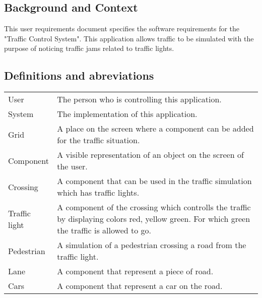 \documentclass[a4paper,11pt]{article}
\title{\Title}
\author{}
\date{\today}
\begin{document}
\begin{titlepage}
\maketitle
\end{titlepage}

  	\linespread{1.15} %
    
  	\subsection*{Background and Context}
  	This user requirements document specifies the software requirements for the "Traffic Control System". This application allows traffic to be simulated with the purpose of noticing traffic jams related to traffic lights.
  	
  	\subsection*{Definitions and abreviations}
  	\begin{longtable}[l]{p{50pt} p{350pt}} 
  		User & The person who is controlling this application.\\
  		System & The implementation of this application.\\
  		Grid & A place on the screen where a component can be added for the traffic situation.\\
  		Component & A visible representation of an object on the screen of the user.\\
  		Crossing & A component that can be used in the traffic simulation which has traffic lights.\\
  		Traffic light & A component of the crossing which controlls the traffic by displaying colors red, yellow green. For which green the traffic is allowed to go.\\
  		Pedestrian & A simulation of a pedestrian crossing a road from the traffic light.\\
  		Lane & A component that represent a piece of road.\\
  		Cars & A component that represent a car on the road.\\
  	\end{longtable}
  	
  	\tableofcontents
  	\newpage
  	
  	
  	
  	
    
    
    
\end{document}
